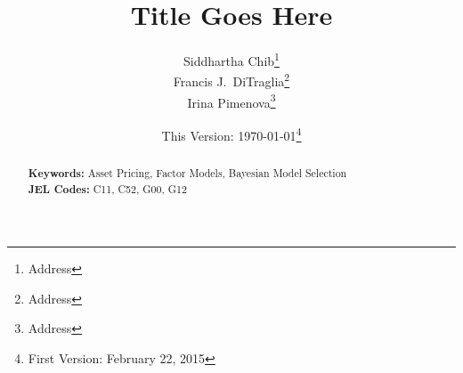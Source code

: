 \documentclass[12pt]{article}
\begin{document}
\title{Title Goes Here}

\author{Siddhartha Chib\footnote{Address} \\ 
Francis J.\ DiTraglia\footnote{Address} \\
Irina Pimenova\footnote{Address}}
\date{\small This Version: \today\footnote{First Version: February 22, 2015}}
\maketitle 
\begin{abstract}
  \singlespacing
	

  	\bigskip
	\noindent\textbf{Keywords:} Asset Pricing, Factor Models, Bayesian Model Selection\\
	\medskip
  \noindent\textbf{JEL Codes:} C11, C52, G00, G12 
\end{abstract}









%
\end{document}
